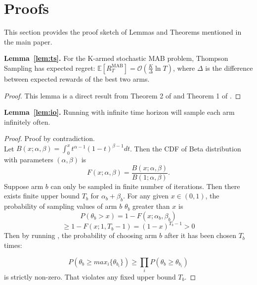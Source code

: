 \appendix

\section{Proofs}
\label{app:pf}
This section provides the proof sketch of Lemmas and Theorems mentioned in the main paper.

\textbf{Lemma~\ref{lem:ts}.}
For the K-armed stochastic MAB problem, Thompson Sampling has expected regret:
$\mathbb{E}[R_T^{\text{MAB}}] = \mathcal{O}\left(\frac{K}{\Delta}\ln T \right)$, where $\Delta$ is the difference between expected rewards of the best two arms.
\begin{proof}
This lemma is a direct result from Theorem 2 of \citet{agrawal2012} and Theorem 1 of \citet{kaufmann2012}.
\end{proof}

\textbf{Lemma~\ref{lem:io}.}
Running \multisparring with infinite time horizon will sample each arm infinitely often.
\begin{proof}
Proof by contradiction. \\
Let $B(x;\alpha,\beta) = \int_0^x t^{\alpha-1}(1-t)^{\beta-1} dt$. 
Then the CDF of Beta distribution with parameters $(\alpha,\beta)$ is $$F(x;\alpha,\beta) = \frac{B(x;\alpha,\beta)}{B(1;\alpha,\beta)}.$$ 
Suppose arm $b$ can only be sampled in finite number of iterations. Then there exists finite upper bound $T_b$ for $\alpha_b + \beta_b$. For any given $x \in (0,1)$, the probability of sampling values of arm $b$ $\theta_b$ greater than $x$ is $$P(\theta_b > x) = 1-F(x;\alpha_b,\beta_b) $$ 
$$\geq 1-F(x;1,T_b-1) = (1 - x)^{T_b-1} >0$$
Then by running \multisparring, the probability of choosing arm $b$ after it has been chosen $T_b$ times: 

$$P(\theta_b \geq max_i\{\theta_{b_i}\}) \geq \prod_i P(\theta_b \geq \theta_{b_i})$$
is strictly non-zero. That violates any fixed upper bound $T_b$.
\end{proof}

